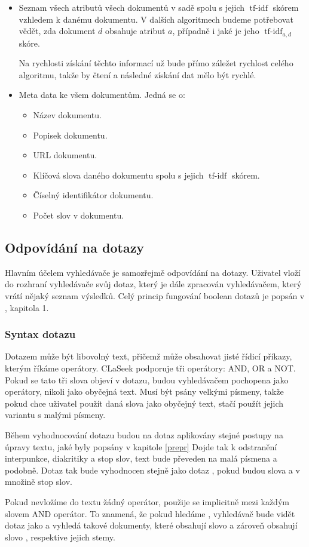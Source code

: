 \documentclass[12pt]{article}
\newcommand{\name}{CLaSeek}
\newcommand{\ssection}[1]{\subsection{#1}}
\newcommand{\sssection}[1]{\subsubsection{#1}}
\DeclareMathOperator{\tfidf}{tf-idf}
\begin{document}
\begin{itemize}
\item Seznam všech atributů všech dokumentů v sadě spolu s jejich $\tfidf$ skórem vzhledem k danému dokumentu. V dalších algoritmech budeme potřebovat vědět, zda dokument $d$ obsahuje atribut $a$, případně i jaké je jeho $\tfidf_{a, d}$ skóre. 

Na rychlosti získání těchto informací už bude přímo záležet rychlost celého algoritmu, takže by čtení a následné získání dat mělo být rychlé. 

\item Meta data ke všem dokumentům. Jedná se o:
	\begin{itemize}
	\item Název dokumentu. 
	\item Popisek dokumentu.
	\item URL dokumentu. 
	\item Klíčová slova daného dokumentu spolu s jejich $\tfidf$ skórem. 
	\item Číselný identifikátor dokumentu.
	\item Počet slov v dokumentu. 
	\end{itemize}
\end{itemize}


\ssection{Odpovídání na dotazy}
Hlavním účelem vyhledávače je samozřejmě odpovídání na dotazy. Uživatel vloží do rozhraní vyhledávače svůj dotaz, který je dále zpracován vyhledávačem, který vrátí nějaký seznam výsledků. Celý princip fungování boolean dotazů je popsán v \cite{introir}, kapitola 1. 

\sssection{Syntax dotazu}
Dotazem může být libovolný text, přičemž může obsahovat jisté řídicí příkazy, kterým říkáme operátory. \name{} podporuje tři operátory: AND, OR a NOT. Pokud se tato tři slova objeví v dotazu, budou vyhledávačem pochopena jako operátory, nikoli jako obyčejná text. Musí být psány velkými písmeny, takže pokud chce uživatel použít daná slova jako obyčejný text, stačí použít jejich variantu s malými písmeny. 

Během vyhodnocování dotazu budou na dotaz aplikovány stejné postupy na úpravy textu, jaké byly popsány v kapitole \ref{prepr} Dojde tak k odstranění interpunkce, diakritiky a stop slov, text bude převeden na malá písmena a podobně. Dotaz  tak bude vyhodnocen stejně jako dotaz , pokud budou slova  a  v množině stop slov. 

Pokud nevložíme do textu žádný operátor, použije se implicitně mezi každým slovem AND operátor. To znamená, že pokud hledáme , vyhledávač bude vidět dotaz jako  a vyhledá takové dokumenty, které obsahují slovo  a zároveň obsahují slovo , respektive jejich stemy. 
\end{document}
